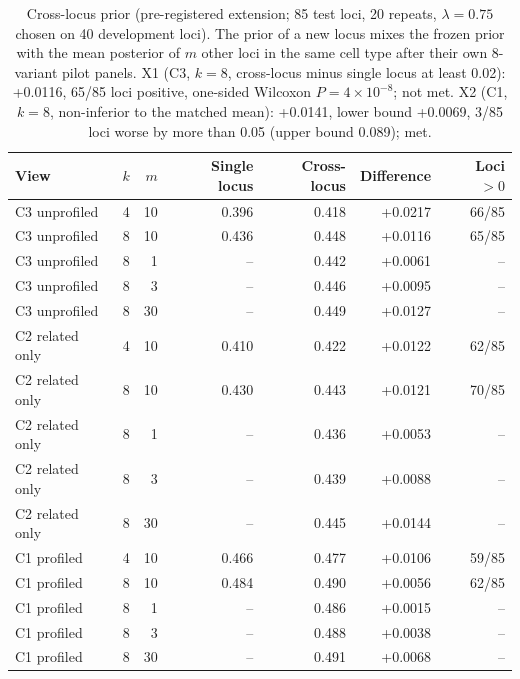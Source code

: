 \begin{table}[H]
\caption{Cross-locus prior (pre-registered extension; 85 test loci, 20 repeats, $\lambda=0.75$ chosen on 40 development loci). The prior of a new locus mixes the frozen prior with the mean posterior of $m$ other loci in the same cell type after their own 8-variant pilot panels. X1 (C3, $k=8$, cross-locus minus single locus at least 0.02): +0.0116, 65/85 loci positive, one-sided Wilcoxon $P=4\times10^{-8}$; not met. X2 (C1, $k=8$, non-inferior to the matched mean): +0.0141, lower bound +0.0069, 3/85 loci worse by more than 0.05 (upper bound 0.089); met. }\label{tab:s9}
\centering\small
\begin{tabular}{lrrrrrr}
\toprule
View & $k$ & $m$ & Single locus & Cross-locus & Difference & Loci $>0$ \\
\midrule
C3 unprofiled & 4 & 10 & 0.396 & 0.418 & +0.0217 & 66/85 \\
C3 unprofiled & 8 & 10 & 0.436 & 0.448 & +0.0116 & 65/85 \\
C3 unprofiled & 8 & 1 & -- & 0.442 & +0.0061 & -- \\
C3 unprofiled & 8 & 3 & -- & 0.446 & +0.0095 & -- \\
C3 unprofiled & 8 & 30 & -- & 0.449 & +0.0127 & -- \\
C2 related only & 4 & 10 & 0.410 & 0.422 & +0.0122 & 62/85 \\
C2 related only & 8 & 10 & 0.430 & 0.443 & +0.0121 & 70/85 \\
C2 related only & 8 & 1 & -- & 0.436 & +0.0053 & -- \\
C2 related only & 8 & 3 & -- & 0.439 & +0.0088 & -- \\
C2 related only & 8 & 30 & -- & 0.445 & +0.0144 & -- \\
C1 profiled & 4 & 10 & 0.466 & 0.477 & +0.0106 & 59/85 \\
C1 profiled & 8 & 10 & 0.484 & 0.490 & +0.0056 & 62/85 \\
C1 profiled & 8 & 1 & -- & 0.486 & +0.0015 & -- \\
C1 profiled & 8 & 3 & -- & 0.488 & +0.0038 & -- \\
C1 profiled & 8 & 30 & -- & 0.491 & +0.0068 & -- \\
\bottomrule
\end{tabular}
\end{table}

